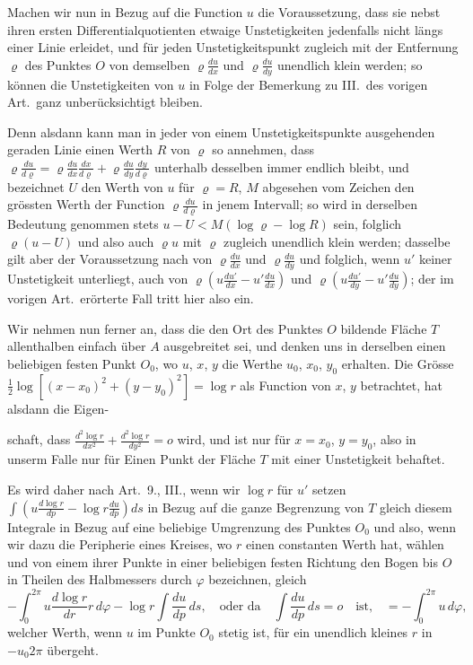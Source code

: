 \documentclass{article}
\begin{document}
Machen wir nun in Bezug auf die Function $u$ die Voraussetzung, dass sie nebst ihren ersten Differentialquotienten etwaige Unstetigkeiten jedenfalls nicht längs einer Linie erleidet, und für jeden Unstetigkeitspunkt zugleich mit der Entfernung $\varrho$ des Punktes $O$ von demselben $\varrho\frac{du}{dx}$ und $\varrho\frac{du}{dy}$ unendlich klein werden; so können die Unstetigkeiten von $u$ in Folge der Bemerkung zu III.\ des vorigen Art.\ ganz unberücksichtigt bleiben.

Denn alsdann kann man in jeder von einem Unstetigkeitspunkte ausgehenden geraden Linie einen Werth $R$ von $\varrho$ so annehmen, dass $\varrho\frac{du}{d\varrho} = \varrho\frac{du}{dx}\frac{dx}{d\varrho} + \varrho\frac{du}{dy}\frac{dy}{d\varrho}$ unterhalb desselben immer endlich bleibt, und bezeichnet $U$ den Werth von $u$ für $\varrho = R$, $M$ abgesehen vom Zeichen den grössten Werth der Function $\varrho\frac{du}{d\varrho}$ in jenem Intervall; so wird in derselben Bedeutung genommen stets $u - U < M(\log\varrho - \log R)$ sein, folglich $\varrho(u - U)$ und also auch $\varrho u$ mit $\varrho$ zugleich unendlich klein werden; dasselbe gilt aber der Voraussetzung nach von $\varrho\frac{du}{dx}$ und $\varrho\frac{du}{dy}$ und folglich, wenn $u'$ keiner Unstetigkeit unterliegt, auch von $\varrho\left(u\frac{du'}{dx} - u'\frac{du}{dx}\right)$ und $\varrho\left(u\frac{du'}{dy} - u'\frac{du}{dy}\right)$; der im vorigen Art.\ erörterte Fall tritt hier also ein.

Wir nehmen nun ferner an, dass die den Ort des Punktes $O$ bildende Fläche $T$ allenthalben einfach über $A$ ausgebreitet sei, und denken uns in derselben einen beliebigen festen Punkt $O_0$, wo $u$, $x$, $y$ die Werthe $u_0$, $x_0$, $y_0$ erhalten. Die Grösse $\frac{1}{2}\log[(x - x_0)^2 + (y - y_0)^2] = \log r$ als Function von $x$, $y$ betrachtet, hat alsdann die Eigen-

schaft, dass $\frac{d^2\log r}{dx^2} + \frac{d^2\log r}{dy^2} = o$ wird, und ist nur für $x = x_0$, $y = y_0$, also in unserm Falle nur für Einen Punkt der Fläche $T$ mit einer Unstetigkeit behaftet.

Es wird daher nach Art.\ 9., III., wenn wir $\log r$ für $u'$ setzen $\displaystyle\int \left(u\frac{d\log r}{dp} - \log r\frac{du}{dp}\right) ds$ in Bezug auf die ganze Begrenzung von $T$ gleich diesem Integrale in Bezug auf eine beliebige Umgrenzung des Punktes $O_0$ und also, wenn wir dazu die Peripherie eines Kreises, wo $r$ einen constanten Werth hat, wählen und von einem ihrer Punkte in einer beliebigen festen Richtung den Bogen bis $O$ in Theilen des Halbmessers durch $\varphi$ bezeichnen, gleich
\[
-\int_0^{2\pi} u\frac{d\log r}{dr} r\,d\varphi - \log r\int \frac{du}{dp}\,ds, \quad \text{oder da} \quad \int \frac{du}{dp}\,ds = o \quad \text{ist,} \quad = -\int_0^{2\pi} u\,d\varphi,
\]
welcher Werth, wenn $u$ im Punkte $O_0$ stetig ist, für ein unendlich kleines $r$ in $-u_0 2\pi$ übergeht.
\end{document}
